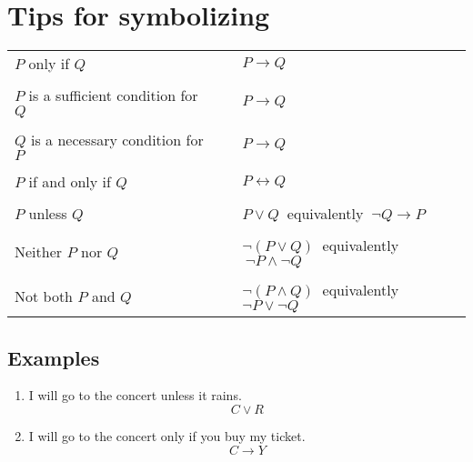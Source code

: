 \documentclass[12pt,fleqn]{article}
\begin{document}
\thispagestyle{empty}

\section*{Tips for symbolizing}

\medskip
\begin{tabular}{l l l}
  $P$ only if $Q$ & & $P\to Q$ \\ \\
  $P$ is a sufficient condition for $Q$ & & $P\to Q$ \\ \\
  $Q$ is a necessary condition for $P$ & & $P\to Q$ \\ \\
  $P$ if and only if $Q$ & & $P\leftrightarrow Q$ \\ \\
  $P$ unless $Q$ & & $P\vee Q\:$ equivalently $\:\neg Q\to P$  \\ \\
  Neither $P$ nor $Q$ & & $\neg (P\vee Q)\:$ equivalently $\:\neg
                          P\wedge\neg Q$  \\ \\
  Not both $P$ and $Q$ & & $\neg (P\wedge Q)\:$ equivalently $\neg
                           P\vee\neg Q$ \end{tabular}

\bigskip
\subsection*{Examples}

\medskip
\begin{enumerate}
\item I will go to the concert unless it rains.
  \[ C\vee R \]
\item I will go to the concert only if you buy my ticket.
  \[ C\to Y \]
\end{enumerate}
\end{document}
